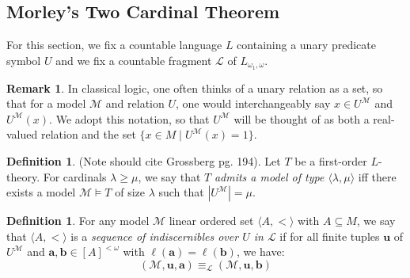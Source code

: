 \documentclass{amsart}
\theoremstyle{definition}
\newtheorem{remark}[theorem]{Remark}
\newtheorem{definition}[theorem]{Definition}
\numberwithin{equation}{theorem}
\newcommand{\V}{\mathbf}
\newcommand{\where}{\mid}
\newcommand{\len}{\ell}
\newcommand{\frag}{\mathcal{L}}
\begin{document}
\subsection{Morley's Two Cardinal Theorem}
  For this section, we fix a countable language $L$ containing a unary predicate symbol $U$ and we fix a countable fragment $\mathcal L$ of $L_{\omega_1,\omega}$.
  \begin{remark}
    In classical logic, one often thinks of a unary relation as a set, so that for a model $\mathcal M$ and relation $U$, one would interchangeably say $x\in U^\mathcal M$ and $U^\mathcal M(x)$.
    We adopt this notation, so that $U^\mathcal M$ will be thought of as both a real-valued relation and the set $\{x\in M\where U^\mathcal M(x)=1\}$.
  \end{remark}
  \begin{definition}
    (Note should cite Grossberg pg. 194).
    Let $T$ be a first-order $L$-theory.
    For cardinals $\lambda\geq \mu$, we say that $T$ \emph{admits a model of type $\langle\lambda,\mu\rangle$} iff there exists a model $\mathcal M\models T$ of size $\lambda$ such that $|U^\mathcal M|=\mu$.
  \end{definition}
  \begin{definition}
    For any model $\mathcal M$ linear ordered set $\langle A,<\rangle$ with $A\subseteq M$, we say that $\langle A,<\rangle$ is a \emph{sequence of indiscernibles over $U$ in $\frag$} if for all finite tuples $\V u$ of $U^\mathcal M$ and $\V a,\V b\in [A]^{<\omega}$ with $\len(\V a)=\len(\V b)$, we have:
    \[
      (\mathcal M, \V u, \V a)\equiv_\frag (\mathcal M,\V u, \V b)
    \]
  \end{definition}
\end{document}
